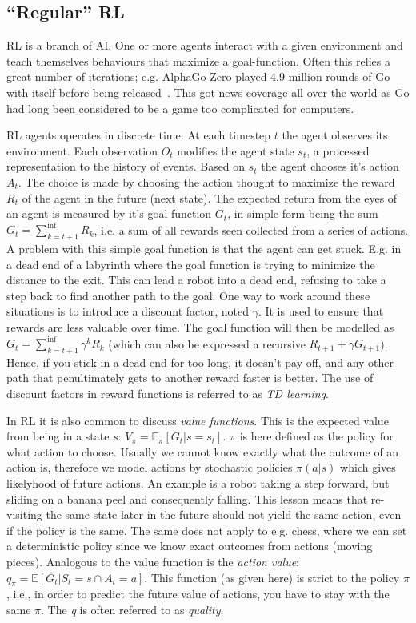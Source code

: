 \documentclass[10pt,twocolumn,letterpaper]{article}
\begin{document}
\subsection{``Regular'' RL}
\gls{RL} is a branch of \gls{AI}. One or more agents interact with a given environment and teach themselves 
behaviours that maximize a goal-function. Often this relies a great number of iterations; e.g. AlphaGo Zero played 4.9 million rounds of Go with itself before being released~\cite{goWithoutHumans}. This got news coverage all over the world as Go had long been considered to be a game too complicated for computers.

\gls{RL} agents operates in discrete time. At each timestep $t$ the agent observes its environment. Each observation $O_{t}$ modifies the agent state $s_{t}$, a processed representation to the history of events. Based on $s_{t}$ the agent chooses it's action $A_{t}$. The choice is made by choosing the action thought to maximize the reward $R_{t}$ of the agent in the future (next state). The expected return from the eyes of an agent is measured by it's goal function $G_{t}$, in simple form being the sum $G_{t} = \sum_{k=t+1}^{\inf{}}{R_{k}}$, i.e. a sum of all rewards seen collected from a series of actions. A problem with this simple goal function is that the agent can get stuck. E.g. in a dead end of a labyrinth where the goal function is trying to minimize the distance to the exit. This can lead a robot into a dead end, refusing to take a step back to find another path to the goal. One way to work around these situations is to introduce a discount factor, noted $\gamma{}$. It is used to ensure that rewards are less valuable over time. The goal function will then be modelled as $G_{t} = \sum_{k=t+1}^{\inf{}}\gamma^{k}{R_{k}}$ (which can also be expressed a recursive $R_{t+1} + \gamma{G_{t+1}}$). Hence, if you stick in a dead end for too long, it doesn't pay off, and any other path that penultimately gets to another reward faster is better. The use of discount factors in reward functions is referred to as \textit{\gls{TD} learning}.

In \gls{RL} it is also common to discuss \textit{value functions}. This is the expected value from being in a state $s$: $V_{\pi} = \mathbb{E}_{\pi} [ G_{t} | s = s_{t}]$. $\pi$ is here defined as the policy for what action to choose. Usually we cannot know exactly what the outcome of an action is, therefore we model actions by stochastic policies $\pi{}(a | s)$ which gives likelyhood of future actions. An example is a robot taking a step forward, but sliding on a banana peel and consequently falling. This lesson means that re-visiting the same state later in the future should not yield the same action, even if the policy is the same. The same does not apply to e.g. chess, where we can set a deterministic policy since we know exact outcomes from actions (moving pieces). 
Analogous to the value function is the \textit{action value}: $q_{\pi{}} = \mathbb{E} [ G_{t} \vert{} S_{t} = s \cap A_{t} = a]$. This function (as given here) is strict to the policy $\pi$, i.e., in order to predict the future value of actions, you have to stay with the same $\pi$. The \textit{q} is often referred to as \textit{quality}. 
\end{document}
